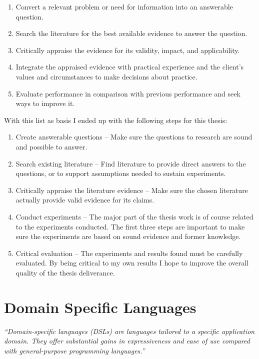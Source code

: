 \documentclass[a4paper,english]{report}
\begin{document}
\begin{enumerate}
\item Convert a relevant problem or need for information into an
  answerable question.
\item Search the literature for the best available evidence to answer
  the question.
\item Critically appraise the evidence for its validity, impact, and
  applicability.
\item Integrate the appraised evidence with practical experience and
  the client's values and circumstances to make decisions about
  practice.
\item Evaluate performance in comparison with previous performance and
  seek ways to improve it.
\end{enumerate}

With this list as basis I ended up with the following steps for this
thesis:

\begin{enumerate}
\item Create answerable questions -- Make sure the questions to
  research are sound and possible to answer.
\item Search existing literature -- Find literature to provide direct
  answers to the questions, or to support assumptions needed to
  sustain experiments.
\item Critically appraise the literature evidence -- Make sure the
  chosen literature actually provide valid evidence for its claims.
\item Conduct experiments -- The major part of the thesis work is of
  course related to the experiments conducted. The first three steps
  are important to make sure the experiments are based on sound
  evidence and former knowledge.
\item Critical evaluation -- The experiments and results found must be
  carefully evaluated. By being critical to my own results I hope to
  improve the overall quality of the thesis deliverance.
\end{enumerate}

\chapter{Domain Specific Languages}

\textit{``Domain-specific languages (DSLs) are languages tailored to a
  specific application domain. They offer substantial gains in
  expressiveness and ease of use compared with general-purpose
  programming languages.''}\cite{mer05}
\end{document}
